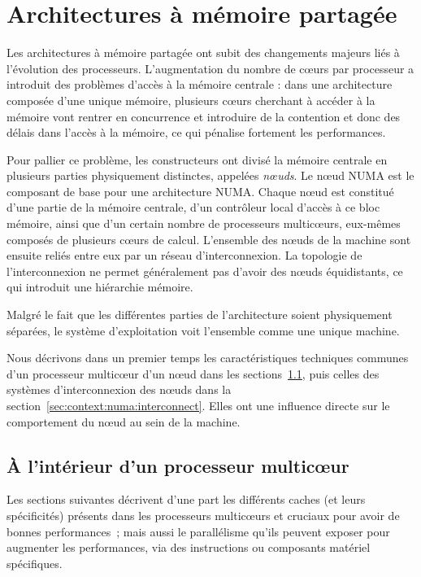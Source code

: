 \section{Architectures à mémoire partagée}\label{sec:context:numa}


Les architectures à mémoire partagée ont subit des changements majeurs liés à l'évolution des processeurs.
L'augmentation du nombre de cœurs par processeur a introduit des problèmes d'accès à la mémoire centrale : dans une architecture composée d'une unique mémoire, plusieurs cœurs cherchant à accéder à la mémoire vont rentrer en concurrence et introduire de la contention et donc des délais dans l'accès à la mémoire, ce qui pénalise fortement les performances.

Pour pallier ce problème, les constructeurs ont divisé la mémoire centrale en plusieurs parties physiquement distinctes, appelées \emph{nœuds}.
Le nœud NUMA est le composant de base pour une architecture NUMA.
Chaque nœud est constitué d'une partie de la mémoire centrale, d'un contrôleur local d'accès à ce bloc mémoire, ainsi que d'un certain nombre de processeurs multicœurs, eux-mêmes composés de plusieurs cœurs de calcul.
L'ensemble des nœuds de la machine sont ensuite reliés entre eux par un réseau d'interconnexion.
La topologie de l'interconnexion ne permet généralement pas d'avoir des nœuds équidistants, ce qui introduit une hiérarchie mémoire.

Malgré le fait que les différentes parties de l'architecture soient physiquement séparées, le système d'exploitation voit l'ensemble comme une unique machine.

Nous décrivons dans un premier temps les caractéristiques techniques communes d'un processeur multicœur d'un nœud dans les sections~\ref{sec:context:numa:multicore}, puis celles des systèmes d'interconnexion des nœuds dans la section~\ref{sec:context:numa:interconnect}.
Elles ont une influence directe sur le comportement du nœud au sein de la machine.

\subsection{À l'intérieur d'un processeur multicœur}\label{sec:context:numa:multicore}

Les sections suivantes décrivent d'une part les différents caches (et leurs spécificités) présents dans les processeurs multicœurs et cruciaux pour avoir de bonnes performances~; mais aussi le parallélisme qu'ils peuvent exposer pour augmenter les performances, via des instructions ou composants matériel spécifiques.


